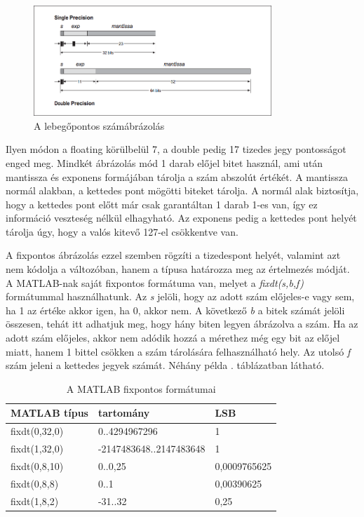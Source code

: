 \begin{figure}[H]
	\centering
	\includegraphics[width = 0.8\textwidth]{figures/floating.png}
	\caption{A lebegőpontos számábrázolás} 
	\label{fig:floating}
\end{figure}

Ilyen módon a floating körülbelül 7, a double pedig 17 tizedes jegy pontosságot enged meg. Mindkét ábrázolás mód 1 darab előjel bitet használ, ami után mantissza és exponens formájában tárolja a szám abszolút értékét. A mantissza normál alakban, a kettedes pont mögötti biteket tárolja. A normál alak biztosítja, hogy a kettedes pont előtt már csak garantáltan 1 darab 1-es van, így ez információ veszteség nélkül elhagyható. Az exponens pedig a kettedes pont helyét tárolja úgy, hogy a valós kitevő 127-el csökkentve van.

A fixpontos ábrázolás ezzel szemben rögzíti a tizedespont helyét, valamint azt nem kódolja a változóban, hanem a típusa határozza meg az értelmezés módját. A MATLAB-nak saját fixpontos formátuma van, melyet a \emph{fixdt(s,b,f)} formátummal használhatunk. Az \emph{s} jelöli, hogy az adott szám előjeles-e vagy sem, ha 1 az értéke akkor igen, ha 0, akkor nem. A következő \emph{b} a bitek számát jelöli összesen, tehát itt adhatjuk meg, hogy hány biten legyen ábrázolva a szám. Ha az adott szám előjeles, akkor nem adódik hozzá a mérethez még egy bit az előjel miatt, hanem 1 bittel csökken a szám tárolására felhasználható hely. Az utolsó \emph{f} szám jeleni a kettedes jegyek számát. Néhány példa . táblázatban látható.

\begin{table}[]
\centering
\begin{tabular}{|l|l|l|}
\hline
MATLAB típus  & tartomány               & LSB \\ \hline
fixdt(0,32,0) & 0..4294967296           & 1   \\ \hline
fixdt(1,32,0) & -2147483648..2147483648	& 1   \\ \hline
fixdt(0,8,10) & 0..0,25        	   	    & 0,0009765625 \\ \hline
fixdt(0,8,8)  & 0..1     			 	& 0,00390625    \\ \hline
fixdt(1,8,2)  & -31..32     			& 0,25    \\ \hline
\end{tabular}
\caption{A MATLAB fixpontos formátumai}
\label{tab:fixdt}
\end{table}

